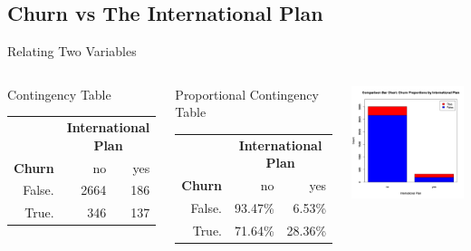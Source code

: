 \documentclass[handout]{beamer}
\begin{document}
\subsection{Churn vs The International Plan}
\begin{frame}{Relating Two Variables}
\begin{columns}
    \begin{block}{Contingency Table}
        \begin{tabular}{r|r|r}
        & \multicolumn{2}{c}{\bf International Plan} \\
        {\bf Churn} & no & yes \\
        \hline
        False. & 2664 & 186 \\
        True. & 346 & 137 \\
        \end{tabular}
    \end{block}
    \begin{block}{Proportional Contingency Table}
        \begin{tabular}{r|r|r}
        & \multicolumn{2}{c}{\bf International Plan} \\
        {\bf Churn} & no & yes \\
        \hline
        False. & 93.47\% & 6.53\% \\
        True. & 71.64\% & 28.36\% \\
        \end{tabular}
    \end{block}
    \includegraphics[width=\textwidth]{images/overlay-churn-international}
\end{columns}
\end{frame}
\end{document}
